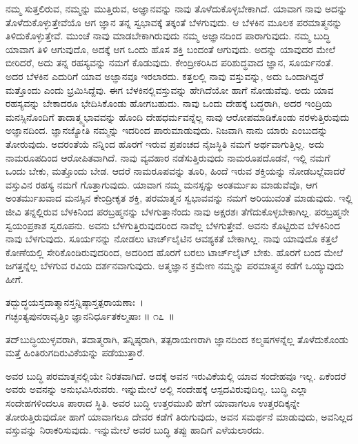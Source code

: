 ನಮ್ಮ ಸುತ್ತಲಿರುವ, ನಮ್ಮನ್ನು ಮುತ್ತಿರುವ, ಅಜ್ಞಾನವನ್ನು ನಾವು ತೊಳೆದುಕೊಳ್ಳಬೇಕಾಗಿದೆ. ಯಾವಾಗ ನಾವು ಅದನ್ನು ತೊಳೆದುಕೊಳ್ಳುತ್ತೇವೆಯೊ ಆಗ ಜ್ಞಾನ ತನ್ನ ಸ್ವಭಾವಕ್ಕೆ ತಕ್ಕಂತೆ ಬೆಳಗುವುದು. ಆ ಬೆಳಕಿನ ಮೂಲಕ ಪರಮಾತ್ಮನನ್ನು ತಿಳಿದುಕೊಳ್ಳುತ್ತೇವೆ. ಮುಂಚೆ ನಾವು ಮಾಡಬೇಕಾ\-ಗಿರುವುದು ನಮ್ಮ ಅಜ್ಞಾನದಿಂದ ಪಾರಾಗುವುದು. ನಮ್ಮ ಬುದ್ಧಿ ಯಾವಾಗ ತಿಳಿ ಆಗುವುದೊ, ಅದಕ್ಕೆ ಆಗ ಒಂದು ಹೊಸ ಶಕ್ತಿ ಬಂದಂತೆ ಆಗುವುದು. ಅದನ್ನು ಯಾವುದರ ಮೇಲೆ ಬೀರಿದರೆ, ಅದು ತನ್ನ ರಹಸ್ಯವನ್ನು ನಮಗೆ ಕೊಡುವುದು. ಕೇಂದ್ರೀಕರಿಸಿದ ಪರಿಶುದ್ಧವಾದ ಜ್ಞಾನ, ಸೂರ್ಯನಂತೆ. ಅದರ ಬೆಳಕಿನ ಎದುರಿಗೆ ಯಾವ ಅಜ್ಞಾನವೂ ಇರಲಾರದು. ಕತ್ತಲಲ್ಲಿ ನಾವು ವಸ್ತುವನ್ನು, ಅದು ಒಂದಾಗಿದ್ದರೆ ಮತ್ತೊಂದು ಎಂದು ಭ್ರಮಿಸಿದ್ದೆವು. ಈಗ ಬೆಳಕಿನಲ್ಲಿ\break ವಸ್ತುವನ್ನು ಹೇಗಿದೆಯೋ ಹಾಗೆ ನೋಡುವೆವು. ಅದು ಯಾವ ರಹಸ್ಯವನ್ನು ಬೇಕಾದರೂ ಭೇದಿಸಿಕೊಂಡು ಹೋಗಬಹುದು. ನಾವು ಒಂದು ದೇಹಕ್ಕೆ ಬದ್ಧರಾಗಿ, ಅದರ ಇಂದ್ರಿಯ ಮನಸ್ಸಿನೊಂದಿಗೆ ತಾದಾತ್ಮ್ಯಭಾವವನ್ನು ಹೊಂದಿ ದೇಹಧರ್ಮವನ್ನೆಲ್ಲ ನಾವು ಆರೋಪಮಾಡಿಕೊಂಡು ನರಳುತ್ತಿರುವುದು ಅಜ್ಞಾನದಿಂದ. ಜ್ಞಾನಜ್ಯೋತಿ ನಮ್ಮನ್ನು ಇದರಿಂದ ಪಾರುಮಾಡುವುದು. ನಿಜವಾಗಿ ನಾನು ಯಾರು ಎಂಬುದನ್ನು ತೋರುವುದು. ಅದರಂತೆಯೆ ನನ್ನಿಂದ ಹೊರಗೆ ಇರುವ ಪ್ರಪಂಚದ ನೈಜಸ್ಥಿತಿ ನಮಗೆ ಅರ್ಥವಾಗುತ್ತಿಲ್ಲ. ಅದು ನಾಮರೂಪದಿಂದ ಆರೋಪಿತವಾಗಿದೆ. ನಾವು ವ್ಯವಹಾರ ನಡೆಸುತ್ತಿರುವುದು ನಾಮರೂಪದೊಡನೆ, ಇಲ್ಲಿ ನಮಗೆ ಒಂದು ಬೇಕು, ಮತ್ತೊಂದು ಬೇಡ. ಆದರೆ ನಾಮರೂಪವನ್ನು ತೂರಿ, ಹಿಂದೆ ಇರುವ ಶಕ್ತಿಯನ್ನು ನೋಡಬಲ್ಲೆವಾದರೆ ವಸ್ತುವಿನ ರಹಸ್ಯ ನಮಗೆ ಗೊತ್ತಾಗುವುದು. ಯಾವಾಗ ನಮ್ಮ ಮನಸ್ಸನ್ನು ಅಂತರ್ಮುಖ ಮಾಡುವೆವೊ, ಆಗ ಅಂತರ್ಮುಖವಾದ ಮನಸ್ಸಿನ ಕೇಂದ್ರೀಕೃತ ಶಕ್ತಿ, ಪರಮಾತ್ಮನ ಸ್ವಭಾವವನ್ನು ನಮಗೆ ಅರಿಯುವಂತೆ ಮಾಡುವುದು. ಇಲ್ಲಿ ಜೀವಿ ತನ್ನಲ್ಲಿರುವ ಬೆಳಕಿನಿಂದ ಪರಬ್ರಹ್ಮನನ್ನು ಬೆಳಗುತ್ತಾನೆಂದು ನಾವು ಅಕ್ಷರಶಃ ತೆಗೆದುಕೊಳ್ಳಬೇಕಾಗಿಲ್ಲ. ಪರಬ್ರಹ್ಮನೇ ಸ್ವಯಂಪ್ರಕಾಶ ಸ್ವರೂಪನು. ಅವನು ಬೆಳಗುತ್ತಿರುವುದರಿಂದ ನಾವೆಲ್ಲ ಬೆಳಗುತ್ತೇವೆ. ಅವನು ಕೊಟ್ಟಿರುವ ಬೆಳಕಿನಿಂದ ನಾವು ಬೆಳಗುವುದು. ಸೂರ್ಯನನ್ನು ನೋಡಲು ಟಾರ್ಚ್​ಲೈಟಿನ ಆವಶ್ಯಕತೆ ಬೇಕಾಗಿಲ್ಲ. ನಾವು ಯಾವುದೊ ಕತ್ತಲೆ ಕೋಣೆಯಲ್ಲಿ ಸೇರಿಕೊಂಡಿರುವುದರಿಂದ, ಅದರಿಂದ ಹೊರಗೆ ಬರಲು ಟಾರ್ಚ್​ಲೈಟ್ ಬೇಕು. ಹೊರಗೆ ಬಂದ ಮೇಲೆ ಜಗತ್ತನ್ನೆಲ್ಲ ಬೆಳಗುವ ರವಿಯ ದರ್ಶನವಾಗುವುದು. ಆತ್ಮಜ್ಞಾನ ಕ್ರಮೇಣ ನಮ್ಮನ್ನು ಪರಮಾತ್ಮನ ಕಡೆಗೆ ಒಯ್ಯುವುದು ಹೀಗೆ.

\begin{shloka}
ತದ್ಬುದ್ಧಯಸ್ತದಾತ್ಮಾನಸ್ತನ್ನಿಷ್ಠಾಸ್ತತ್ಪರಾಯಣಾಃ~।\\ಗಚ್ಛಂತ್ಯಪುನರಾವೃತ್ತಿಂ ಜ್ಞಾನನಿರ್ಧೂತಕಲ್ಮಷಾಃ \hfill॥ ೧೭~॥
\end{shloka}

\begin{artha}
ತದ್​ಬುದ್ಧಿಯುಳ್ಳವರಾಗಿ, ತದಾತ್ಮರಾಗಿ, ತನ್ನಿಷ್ಠರಾಗಿ, ತತ್ಪರಾಯಣರಾಗಿ ಜ್ಞಾನದಿಂದ ಕಲ್ಮಷಗಳನ್ನೆಲ್ಲ ತೊಳೆದುಕೊಂಡು ಮತ್ತೆ ಹಿಂತಿರುಗದಿರುವಿಕೆಯನ್ನು ಪಡೆಯುತ್ತಾರೆ.
\end{artha}

ಅವರ ಬುದ್ಧಿ ಪರಮಾತ್ಮನಲ್ಲಿಯೇ ನಿರತವಾಗಿದೆ. ಅದಕ್ಕೆ ಅವನ ಇರುವಿಕೆಯಲ್ಲಿ ಯಾವ ಸಂದೇಹವೂ ಇಲ್ಲ. ಏಕೆಂದರೆ ಅವರು ಅವನನ್ನು ಅನುಭವಿಸಿರುವರು. ಇನ್ನುಮೇಲೆ ಅಲ್ಲಿ ಸಂದೇಹಕ್ಕೆ ಆಸ್ಪದವಿರುವುದಿಲ್ಲ. ಬುದ್ಧಿ ಎಲ್ಲಾ ಸಂದೇಹಗಳಿಂದಲೂ ಪಾರಾದ ಸ್ಥಿತಿ. ಅವರ ಬುದ್ಧಿ ಉತ್ತರಮುಖಿ ಹೇಗೆ ಯಾವಾಗಲೂ ಉತ್ತರದಿಕ್ಕನ್ನೇ ತೋರುತ್ತಿರುವುದೋ ಹಾಗೆ ಯಾವಾಗಲೂ ದೇವರ ಕಡೆಗೆ ತಿರುಗುವುದು, ಅವನ ಸಮರ್ಥನೆ ಮಾಡುವುದು, ಅವನಿಲ್ಲದ ವಸ್ತುವನ್ನು ನಿರಾಕರಿಸುವುದು. ಇನ್ನುಮೇಲೆ ಅವರ ಬುದ್ಧಿ ತಪ್ಪು ಹಾದಿಗೆ ಎಳೆಯಲಾರದು.

